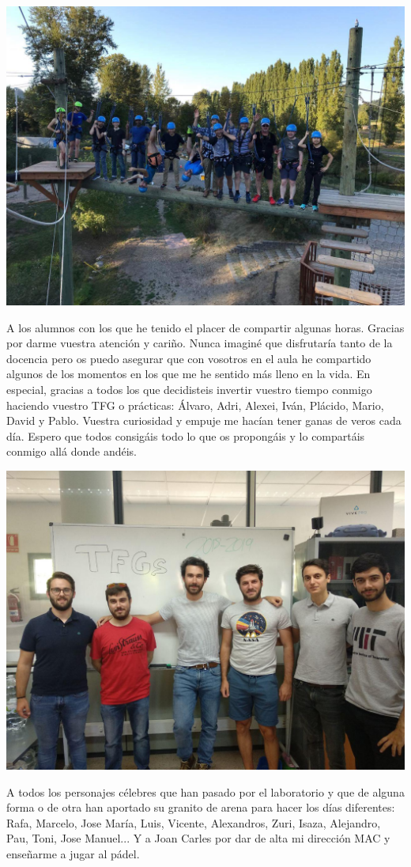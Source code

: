 \begin{center}
\includegraphics[width=0.6\linewidth]{Figures/Ack/frl2}
\end{center}

A los alumnos con los que he tenido el placer de compartir algunas horas. Gracias por darme vuestra atención y cariño. Nunca imaginé que disfrutaría tanto de la docencia pero os puedo asegurar que con vosotros en el aula he compartido algunos de los momentos en los que me he sentido más lleno en la vida. En especial, gracias a todos los que decidisteis invertir vuestro tiempo conmigo haciendo vuestro TFG o prácticas: Álvaro, Adri, Alexei, Iván, Plácido, Mario, David y Pablo. Vuestra curiosidad y empuje me hacían tener ganas de veros cada día. Espero que todos consigáis todo lo que os propongáis y lo compartáis conmigo allá donde andéis.

\begin{center}
\includegraphics[width=0.64\linewidth]{Figures/Ack/tfg1}
\end{center}

A todos los personajes célebres que han pasado por el laboratorio y que de alguna forma o de otra han aportado su granito de arena para hacer los días diferentes: Rafa, Marcelo, Jose María, Luis, Vicente, Alexandros, Zuri, Isaza, Alejandro, Pau, Toni, Jose Manuel... Y a Joan Carles por dar de alta mi dirección MAC y enseñarme a jugar al pádel.

